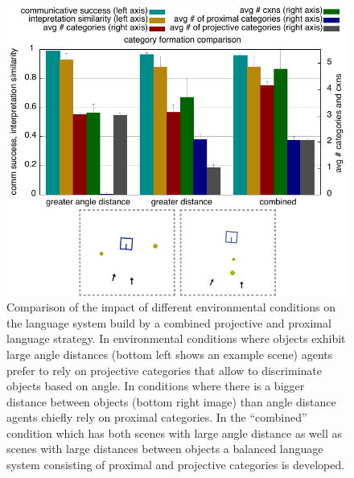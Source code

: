 \begin{figure}
	\begin{center}
		\includegraphics[width=1.0\columnwidth]{figs/category-formation-proximal+projective-compare-angle-distance-distance-combined.pdf}
	\end{center}
	\caption[Impact of different environmental conditions on 
	proximal and projective systems]{Comparison of the impact of 
		different environmental conditions on the language
		system build by a combined projective and proximal language strategy. In environmental
		conditions where objects exhibit large angle distances (bottom left shows an example scene) 
		agents prefer to rely on projective categories that allow to discriminate objects based on angle. 
		In conditions where there is a bigger distance between objects (bottom right image) 
		than angle distance agents chiefly rely on
		proximal categories. In the ``combined'' condition which has both scenes with 
		large angle distance as well as scenes with large distances between objects a balanced
		language system consisting of proximal and projective categories is developed.}
	\label{f:compare-projective+proximal}
\end{figure}

